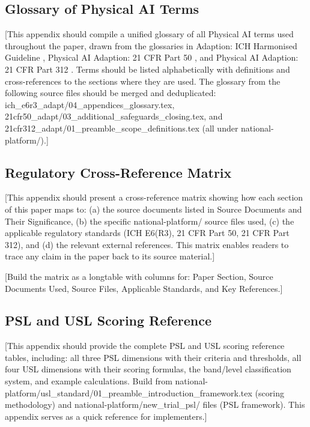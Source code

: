 \newpage

\subsection{Glossary of Physical AI Terms}
\label{app:glossary}

[This appendix should compile a unified glossary of all Physical AI terms
used throughout the paper, drawn from the glossaries in Adaption: ICH
Harmonised Guideline \cite{ich-adapt}, Physical AI Adaption: 21 CFR Part 50
\cite{cfr50-adapt}, and Physical AI Adaption: 21 CFR Part 312
\cite{cfr312-adapt}. Terms should be listed alphabetically with definitions
and cross-references to the sections where they are used. The glossary from
the following source files should be merged and deduplicated:
ich\_e6r3\_adapt/04\_appendices\_glossary.tex,
21cfr50\_adapt/03\_additional\_safeguards\_closing.tex, and
21cfr312\_adapt/01\_preamble\_scope\_definitions.tex
(all under national-platform/).]

\newpage

\subsection{Regulatory Cross-Reference Matrix}
\label{app:cross-reference}

[This appendix should present a cross-reference matrix showing how each
section of this paper maps to: (a) the source documents listed in Source
Documents and Their Significance, (b) the specific national-platform/
source files used, (c) the applicable regulatory standards (ICH E6(R3),
21 CFR Part 50, 21 CFR Part 312), and (d) the relevant external references.
This matrix enables readers to trace any claim in the paper back to its
source material.]

[Build the matrix as a longtable with columns for: Paper Section, Source
Documents Used, Source Files, Applicable Standards, and Key References.]

\newpage

\subsection{PSL and USL Scoring Reference}
\label{app:scoring}

[This appendix should provide the complete PSL and USL scoring reference
tables, including: all three PSL dimensions with their criteria and thresholds,
all four USL dimensions with their scoring formulas, the band/level
classification system, and example calculations. Build from
national-platform/usl\_standard/01\_preamble\_introduction\_framework.tex
(scoring methodology) and national-platform/new\_trial\_psl/ files (PSL
framework). This appendix serves as a quick reference for implementers.]

